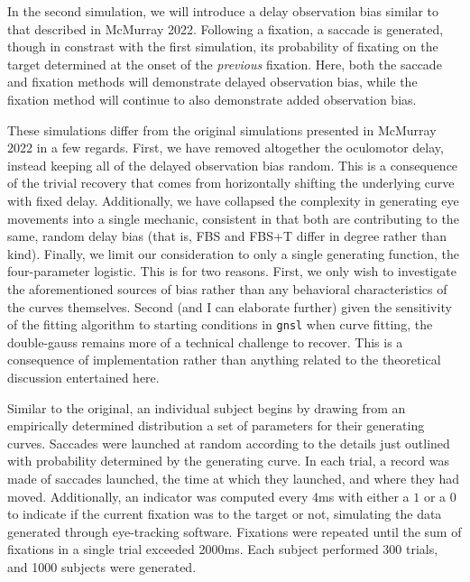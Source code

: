 \documentclass{article}
\newcommand{\xt}{\texttt}%
\begin{document}
In the second simulation, we will introduce a delay observation bias similar to that described in McMurray 2022. Following a fixation, a saccade is generated, though in constrast with the first simulation, its probability of fixating on the target determined at the onset of the \textit{previous} fixation. Here, both the saccade and fixation methods will demonstrate delayed observation bias, while the fixation method will continue to also demonstrate added observation bias.

These simulations differ from the original simulations presented in McMurray 2022 in a few regards. First, we have removed altogether the oculomotor delay, instead keeping all of the delayed observation bias random. This is a consequence of the trivial recovery that comes from horizontally shifting the underlying curve with fixed delay. Additionally, we have collapsed the complexity in generating eye movements into a single mechanic, consistent in that both are contributing to the same, random delay bias (that is, FBS and FBS+T differ in degree rather than kind). Finally, we limit our consideration to only a single generating function, the four-parameter logistic. This is for two reasons. First, we only wish to investigate the aforementioned sources of bias rather than any behavioral characteristics of the curves themselves. Second (and I can elaborate further) given the sensitivity of the fitting algorithm to starting conditions in \xt{gnsl} when curve fitting, the double-gauss remains more of a technical challenge to recover. This is a consequence of implementation rather than anything related to the theoretical discussion entertained here. 

Similar to the original, an individual subject begins by drawing from an empirically determined distribution a set of parameters for their generating curves. Saccades were launched at random according to the details just outlined with probability determined by the generating curve. In each trial, a record was made of saccades launched, the time at which they launched, and where they had moved. Additionally, an indicator was computed every 4ms with either a $1$ or a $0$ to indicate if the current fixation was to the target or not, simulating the data generated through eye-tracking software. Fixations were repeated until the sum of fixations in a single trial exceeded 2000ms. Each subject performed 300 trials, and 1000 subjects were generated.
\end{document}
